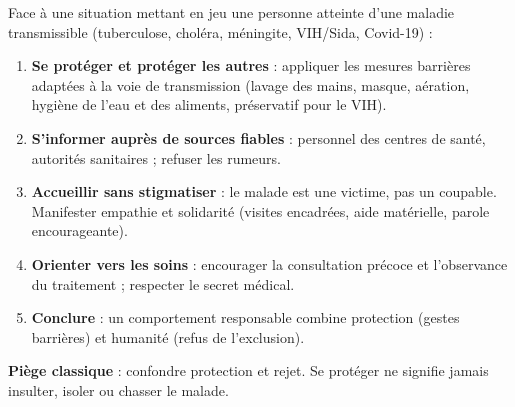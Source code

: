 \documentclass[11pt]{article}
\newcommand{\cle}[1]{{\popxbold\color{popdark}#1}}
\begin{document}
\begin{methode}
Face à une situation mettant en jeu une personne atteinte d'une maladie transmissible (tuberculose, choléra, méningite, VIH/Sida, Covid-19) :
\begin{enumerate}
\item \textbf{Se protéger et protéger les autres} : appliquer les \cle{mesures barrières} adaptées à la voie de transmission (lavage des mains, masque, aération, hygiène de l'eau et des aliments, préservatif pour le VIH).
\item \textbf{S'informer auprès de sources fiables} : personnel des centres de santé, autorités sanitaires ; refuser les rumeurs.
\item \textbf{Accueillir sans stigmatiser} : le malade est une victime, pas un coupable. Manifester \cle{empathie} et solidarité (visites encadrées, aide matérielle, parole encourageante).
\item \textbf{Orienter vers les soins} : encourager la consultation précoce et l'observance du traitement ; respecter le \cle{secret médical}.
\item \textbf{Conclure} : un comportement responsable combine \cle{protection} (gestes barrières) et \cle{humanité} (refus de l'exclusion).
\end{enumerate}
\textbf{Piège classique} : confondre protection et rejet. Se protéger ne signifie jamais insulter, isoler ou chasser le malade.
\end{methode}
\end{document}
